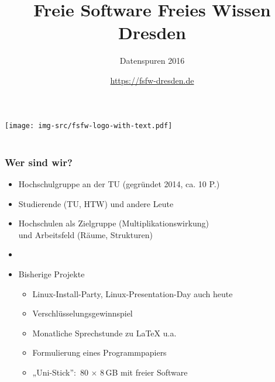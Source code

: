 \documentclass{beamer}
\title{Freie Software Freies Wissen Dresden}
\subtitle{Datenspuren 2016}
\author{\url{https://fsfw-dresden.de}}
\begin{document}
\begin{frame}
  \begin{center}%
    \texttt{[image: img-src/fsfw-logo-with-text.pdf]}\\%
    \vspace*{-1em}{Freie Software Freies Wissen}\\[1em]
  \end{center}
\end{frame}

\begin{frame}[label=ct1]
  \frametitle{Wer sind wir?}

  \begin{itemize}
  \item Hochschulgruppe an der TU (gegründet 2014, ca. 10 P.)
  \item Studierende (TU, HTW) und andere Leute
  \item Hochschulen als Zielgruppe (Multiplikationswirkung)\\
    und Arbeitsfeld (Räume, Strukturen)
  \item[]
    \pause
  \item Bisherige Projekte
    \begin{itemize}
    \item Linux-Install-Party, Linux-Presentation-Day {\tiny auch heute}
    \item Verschlüsselungsgewinnspiel
    \item Monatliche Sprechstunde zu \LaTeX{} u.a.
    \item Formulierung eines Programmpapiers
    \item „Uni-Stick”:~80 $\times$ 8\,GB mit freier Software
    \end{itemize}
  \end{itemize}
\end{frame}
\end{document}
